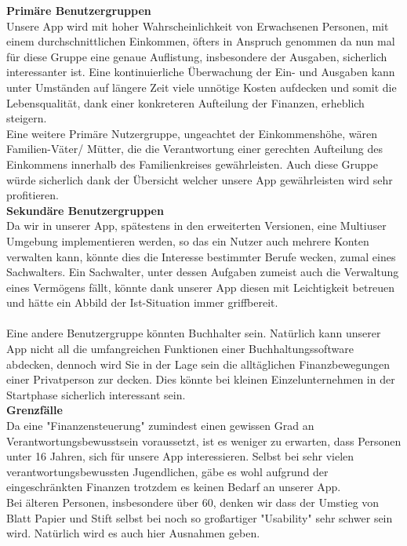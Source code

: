 \documentclass[runningheads,a4paper]{llncs}
\begin{document}
\textbullet \textbf{ Primäre Benutzergruppen}\\
Unsere App wird mit hoher Wahrscheinlichkeit von Erwachsenen Personen, mit einem durchschnittlichen Einkommen, öfters in Anspruch genommen da nun mal für diese Gruppe eine genaue Auflistung, insbesondere der Ausgaben,  sicherlich interessanter ist. Eine kontinuierliche Überwachung der Ein- und Ausgaben kann unter Umständen auf längere Zeit viele unnötige Kosten aufdecken und somit die Lebensqualität, dank einer konkreteren Aufteilung der Finanzen, erheblich steigern.\\
Eine weitere Primäre Nutzergruppe, ungeachtet der Einkommenshöhe, wären Familien-Väter/ Mütter, die die Verantwortung einer gerechten Aufteilung des Einkommens innerhalb des Familienkreises gewährleisten. Auch diese Gruppe würde sicherlich dank der Übersicht welcher unsere App gewährleisten wird sehr profitieren.\\

\textbullet\textbf{ Sekundäre Benutzergruppen}\\
Da wir in unserer App, spätestens in den erweiterten Versionen, eine Multiuser Umgebung implementieren werden, so das ein Nutzer auch mehrere Konten verwalten kann, könnte dies die  Interesse bestimmter Berufe wecken, zumal eines Sachwalters. Ein Sachwalter, unter dessen Aufgaben zumeist auch die Verwaltung eines Vermögens fällt, könnte dank unserer App diesen mit Leichtigkeit betreuen und hätte ein Abbild der Ist-Situation immer griffbereit. \\\\
Eine andere Benutzergruppe könnten Buchhalter sein. Natürlich kann unserer App nicht all die umfangreichen Funktionen einer Buchhaltungssoftware abdecken, dennoch wird Sie in der Lage sein die alltäglichen Finanzbewegungen einer Privatperson zur decken.  Dies könnte bei kleinen Einzelunternehmen in der Startphase sicherlich interessant sein. \\


\textbullet \textbf{ Grenzfälle}\\
Da eine "Finanzensteuerung" zumindest einen gewissen Grad an Verantwortungsbewusstsein voraussetzt, ist es weniger zu erwarten, dass Personen unter 16 Jahren, sich für unsere App interessieren. Selbst bei sehr vielen verantwortungsbewussten Jugendlichen, gäbe es wohl aufgrund der eingeschränkten Finanzen trotzdem es keinen Bedarf an unserer App. \\
Bei älteren Personen, insbesondere über 60, denken wir dass der Umstieg von Blatt Papier und Stift selbst bei noch so großartiger "Usability" sehr schwer sein wird. Natürlich wird es auch hier Ausnahmen geben.  
\end{document}
